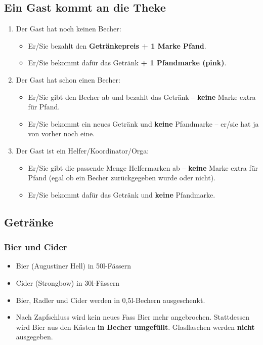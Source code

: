 \subsection{Ein Gast kommt an die Theke}
\begin{enumerate}
  \item Der Gast hat noch keinen Becher:
    \begin{itemize}
      \item Er/Sie bezahlt den \textbf{Getränkepreis + 1 Marke Pfand}.
      \item Er/Sie bekommt dafür das Getränk \textbf{+ 1 Pfandmarke (pink)}.
    \end{itemize}
  \item Der Gast hat schon einen Becher:
    \begin{itemize}
      \item Er/Sie gibt den Becher ab und bezahlt das Getränk -- \textbf{keine} Marke extra für Pfand.
      \item Er/Sie bekommt ein neues Getränk und \textbf{keine} Pfandmarke -- er/sie hat ja von vorher noch eine.
    \end{itemize}
  \item Der Gast ist ein Helfer/Koordinator/Orga:
    \begin{itemize}
      \item Er/Sie gibt die passende Menge Helfermarken ab -- \textbf{keine} Marke extra für Pfand (egal ob ein Becher zurückgegeben wurde oder nicht).
      \item Er/Sie bekommt dafür das Getränk und \textbf{keine} Pfandmarke.
    \end{itemize}
\end{enumerate}
\subsection{Getränke}
\subsubsection{Bier und Cider}
\begin{itemize}
  \item Bier (Augustiner Hell) in 50l-Fässern
  \item Cider (Strongbow) in 30l-Fässern %
  \item Bier, Radler und Cider werden in 0,5l-Bechern ausgeschenkt.
  \item Nach Zapfschluss wird kein neues Fass Bier mehr angebrochen. Stattdessen wird Bier aus den Kästen \textbf{in Becher umgefüllt}. Glasflaschen werden \textbf{nicht} ausgegeben.
\end{itemize}
